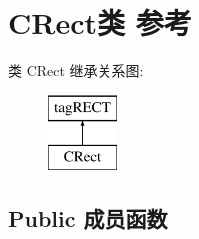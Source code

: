 \hypertarget{class_c_rect}{}\section{C\+Rect类 参考}
\label{class_c_rect}
类 C\+Rect 继承关系图\+:\begin{figure}[H]
\begin{center}
\leavevmode
\includegraphics[height=2.000000cm]{class_c_rect}
\end{center}
\end{figure}
\subsection*{Public 成员函数}
